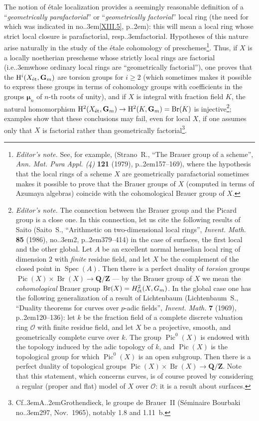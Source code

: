 \documentclass[11pt,a4paper,oneside]{book}
\providecommand{\sisi}[2]{#2}
\providecommand{\nde}[1]{\footnote{\textit{Editor's note.} #1}}
\providecommand{\sfootnote}[1]{\footnote{#1}}
\providecommand{\og}{``}
\providecommand{\fg}{''\xspace}
\providecommand{\Cf}{Cf.\kern.3em}
\providecommand{\ie}{i.e.\kern.3em}
\providecommand{\resp}{resp.\kern.3em}
\providecommand{\ptbl}{.\kern.2em}
\providecommand{\numero}{no.\kern.3em}
\providecommand{\Oo}{\mathcal O}
\providecommand{\bbmu}{\boldsymbol{\mu}}
\providecommand{\GG}{\mathbf G}
\providecommand{\QQ}{\mathbf Q}
\providecommand{\ZZ}{\mathbf Z}
\DeclareMathOperator{\Br}{Br}
\providecommand{\Spec}{\operatorname{Spec}}
\providecommand{\Pic}{\operatorname{Pic}}
\renewcommand{\H}{\mathrm H}
\providecommand{\et}{\textup{\'et}}
\theoremstyle{plain}
\theoremstyle{definition}
\theoremstyle{remark}
\renewcommand{\Ref}[1]{\textup{\ref{#1}}}
\begin{document}
\label{commpara}%
The notion of \'etale localization provides a seemingly reasonable definition of a \og \emph{geometrically parafactorial}\fg or \og \emph{geometrically factorial}\fg local ring\sisi{,}{} (the need for which was indicated in \numero\Ref{XIII.5}, p\ptbl\sisi{20}{\pageref{pXIII20}}): this will mean a local ring whose strict local closure is parafactorial, \resp factorial. Hypotheses of this nature arise naturally in the study of the \'etale cohomology of preschemes\nde{See, for example, (Strano~R., {\og The Brauer group of a scheme\fg}, \emph{Ann. Mat. Pura Appl. (4)} \textbf{121} (1979), p\ptbl 157--169), where the hypothesis that the local rings of a scheme $X$ are geometrically parafactorial sometimes makes it possible to prove that the Brauer groups of $X$ (computed in terms of Azumaya algebras) coincide with the cohomological Brauer group of $X$.}. Thus, if $X$ is a locally noetherian prescheme whose strictly local rings are factorial (\ie whose ordinary local rings are \og geometrically factorial\fg), one proves that the $\H^i(X_{\et},\GG_m)$ are torsion groups for $i\geq 2$ (which sometimes makes it possible to express these groups in terms of cohomology groups with coefficients in the groups $\bbmu_n$ of $n$\sisi{th}{-th} roots of unity), and if $X$ is integral with fraction field $K$, the natural homomorphism $\H^2(X_{\et},\GG_m)\to\H^2(K,\GG_m)=\Br(K)$ is injective\nde{The connection between the Brauer group and the Picard group is a close one. In this connection, let us cite the following results of Saito (Saito~S., {\og Arithmetic on two-dimensional local rings\fg}, \emph{Invent. Math.} \textbf{85} (1986), \numero 2, p\ptbl 379--414) in the case of surfaces, the first local and the other global. Let $A$ be an excellent normal henselian local ring of dimension $2$ with \textit{finite} residue field, and let $X$ be the complement of the closed point in $\Spec(A)$. Then there is a perfect duality of \emph{torsion} groups $\Pic(X)\times\Br(X)\to\QQ/\ZZ$ --- by the Brauer group of $X$ we mean the \emph{cohomological} Brauer group $\textrm{Br}(X)=H^2_\et(X,G_m)$. In the global case one has the following generalization of a result of Lichtenbaum (Lichtenbaum~S., {\og Duality theorems for curves over $p$-adic fields\fg}, \emph{Invent. Math.} \textbf{7} (1969), p\ptbl 120--136): let $k$ be the fraction field of a complete discrete valuation ring $\Oo$ with finite residue field, and let $X$ be a projective, smooth, and geometrically complete curve over $k$. The group $\Pic^0(X)$ is endowed with the topology induced by the adic topology of $k$, and $\Pic(X)$ is the topological group for which $\Pic^0(X)$ is an open subgroup. Then there is a perfect duality of topological groups $\Pic(X)\times\Br(X)\to\QQ/\ZZ$. Note that this statement, which concerns curves, is of course proved by considering a regular (proper and flat) model of $X$ over $\Oo$: it is a result about surfaces.}; examples show that these conclusions may fail, even for local $X$, if one assumes only that $X$ is factorial rather than geometrically factorial\sfootnote{\Cf A\ptbl \sisi{GROTHENDIECK}{Grothendieck}, le groupe de Brauer~II (S\'eminaire Bourbaki \numero 297, Nov.~1965), notably 1.8 and 1.11~b.}.
\end{document}
